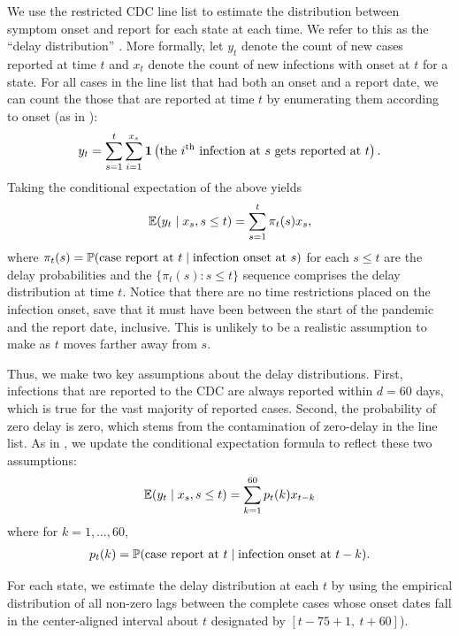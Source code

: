 \documentclass{article}
\begin{document}
We use the restricted CDC line list to estimate the distribution between symptom
onset and report for each state at each time. We refer to this as the ``delay
distribution'' \citep[see
\autoref{fig:cases_to_infect_flowchart} or][]{jahja2022real}. More formally, let
$y_t$ denote the count of new cases reported at time $t$ and $x_t$ denote the
count of new infections with onset at $t$ for a state. For all cases in the line
list that had both an onset and a report date, we can count the those that are
reported at time $t$ by enumerating them according to onset (as in
\citealp{jahja2022real}):
\begin{align*}
y_t = \sum_{s=1}^{t} \sum_{i=1}^{x_s}\indicator \left ( \text{the }i\th\text{ infection at }
 s \text{ gets reported at }t \right ).
\end{align*}
Taking the conditional expectation of the above yields
\begin{align*}
\E(y_t \mid x_s, s \leq t) = \sum_{s=1}^{t} \pi_t(s) x_s ,
\end{align*}
where $\pi_t(s) = \P(\text{case report at }t \mid \text{infection onset at }s)$ for
each $s \leq t$ are the delay probabilities and the $\{ \pi_t(s) : s \leq t
\}$ sequence comprises the delay distribution at time $t$. Notice that
there are no time restrictions placed on the infection onset, save that it must
have been between the start of the pandemic and the report date, inclusive. This is
unlikely to be a realistic assumption to make as $t$ moves farther away from
$s$. 

Thus, we make two key assumptions about the delay distributions. First,
infections that are reported to the CDC are always reported within $d = 60$
days, which is true for the vast majority of reported cases. Second, the
probability of zero delay is zero, which stems from the contamination of
zero-delay in the line list. As in \citet{jahja2022real}, we update the
conditional expectation formula to reflect these two assumptions: 
\begin{align*}
\E(y_t \mid x_s, s \leq t) = \sum_{k=1}^{60} p_t(k) x_{t-k}
\end{align*}
where for $k = 1, \dots, 60$,
\begin{align*}
p_t(k) = \P(\text{case report at }t \mid \text{infection onset at }t-k).
\end{align*}

For each state, we estimate the delay distribution at each $t$ by using the empirical distribution of
all non-zero lags between the complete cases whose onset dates fall in the
center-aligned interval about $t$ designated by $[ t - 75 + 1,\ t + 60
]$). 
\end{document}
